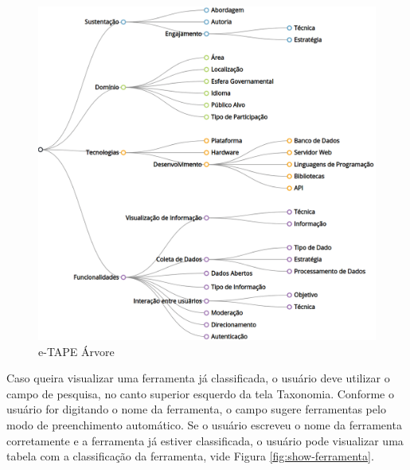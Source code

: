 \begin{figure}[!ht]
    \centering
    \includegraphics[scale=0.20]{./figuras/taxonopart-horizontal.png}
    \caption{e-TAPE Árvore}
    \label{fig:e-tapeArvore}
\end{figure}
\newpage

\par
Caso queira visualizar uma ferramenta já classificada, o usuário deve utilizar o campo de pesquisa, no canto superior esquerdo da tela Taxonomia.
Conforme o usuário for digitando o nome da ferramenta, o campo sugere ferramentas pelo modo de preenchimento automático. Se o usuário escreveu o nome da ferramenta corretamente 
e a ferramenta já estiver classificada, o usuário pode visualizar uma tabela com a classificação da 
ferramenta, vide Figura \ref{fig:show-ferramenta}.

\vspace{0.5cm}

